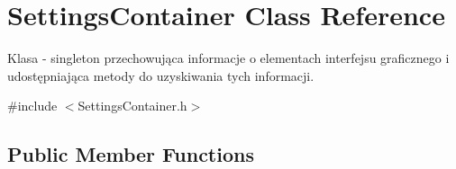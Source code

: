 \hypertarget{class_settings_container}{}\section{Settings\+Container Class Reference}
\label{class_settings_container}


Klasa -\/ singleton przechowująca informacje o elementach interfejsu graficznego i udostępniająca metody do uzyskiwania tych informacji.  




{\ttfamily \#include $<$Settings\+Container.\+h$>$}

\subsection*{Public Member Functions}
